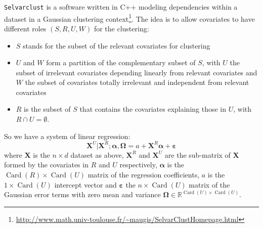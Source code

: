 \documentclass[12pt,a4paper]{report}
\begin{document}
			{\tt Selvarclust} is a software written in C++ modeling dependencies within a dataset			 \cite{maugis2009variable} in a Gaussian clustering context\footnote{\url{http://www.math.univ-toulouse.fr/~maugis/SelvarClustHomepage.html}}.
			The idea is to allow covariates to have different roles $(S,R,U,W)$ for the clustering:
			\begin{itemize}
				\item $S$ stands for the subset of the relevant covariates for clustering
				\item $U$ and $W$ form a partition of the complementary subset of $S$, with $U$ the subset of irrelevant covariates depending linearly from relevant covariates and $W$ the subset of covariates totally irrelevant and independent from relevant covariates
				\item $R$ is the subset of $S$ that contains the covariates explaining those in $U$, with $R\cap U=\emptyset$.
\end{itemize}			 
So we have a system of linear regression:
\begin{equation}
	\boldsymbol{X}^{U}|\boldsymbol{X}^{R};\boldsymbol{\alpha},\boldsymbol{\Omega}=a+\boldsymbol{X}^R \boldsymbol{\alpha}+ \boldsymbol{\varepsilon}
\end{equation}
where $\boldsymbol{X}$ is the $n\times d$ dataset as above, $\boldsymbol{X}^R$ and $\boldsymbol{X}^U$ are the sub-matrix of  $\boldsymbol{X}$ formed by the covariates in $R$ and $U$ respectively, $\boldsymbol{\alpha}$ is the $\operatorname{Card}(R)\times \operatorname{Card}(U)$ matrix of the regression coefficients, $a$ is the $1\times \operatorname{Card}(U)$ intercept vector and $\boldsymbol{\varepsilon}$ the $n\times \operatorname{Card}(U) $ matrix of the Gaussian error terms with zero mean and variance $\boldsymbol{\Omega}\in \mathbb{R}^{\operatorname{Card}(U)\times \operatorname{Card}(U)}$.\\
\end{document}
